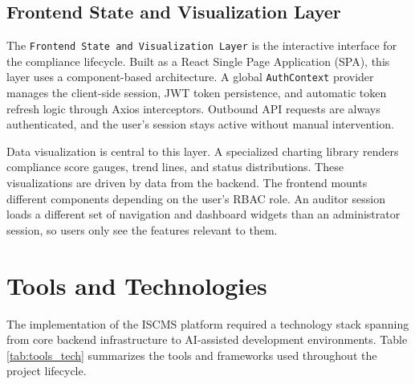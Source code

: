 \subsection{Frontend State and Visualization Layer}
The \texttt{Frontend State and Visualization Layer} is the interactive interface for the compliance lifecycle. Built as a React Single Page Application (SPA), this layer uses a component-based architecture. A global \texttt{AuthContext} provider manages the client-side session, JWT token persistence, and automatic token refresh logic through Axios interceptors. Outbound API requests are always authenticated, and the user's session stays active without manual intervention.

Data visualization is central to this layer. A specialized charting library renders compliance score gauges, trend lines, and status distributions. These visualizations are driven by data from the backend. The frontend mounts different components depending on the user's RBAC role. An auditor session loads a different set of navigation and dashboard widgets than an administrator session, so users only see the features relevant to them.

\section{Tools and Technologies}
The implementation of the ISCMS platform required a technology stack spanning from core backend infrastructure to AI-assisted development environments. Table \ref{tab:tools_tech} summarizes the tools and frameworks used throughout the project lifecycle.

